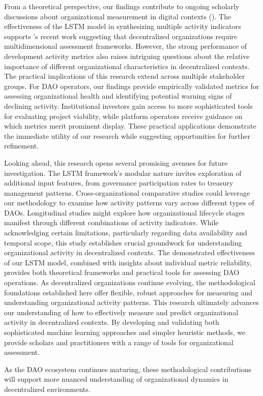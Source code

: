 From a theoretical perspective, our findings contribute to ongoing scholarly discussions about organizational measurement in digital contexts (\cite{fonseca2017succeed}). The effectiveness of the LSTM model in synthesizing multiple activity indicators supports \textcite{li2022future}'s recent work suggesting that decentralized organizations require multidimensional assessment frameworks. However, the strong performance of development activity metrics also raises intriguing questions about the relative importance of different organizational characteristics in decentralized contexts.
The practical implications of this research extend across multiple stakeholder groups. For DAO operators, our findings provide empirically validated metrics for assessing organizational health and identifying potential warning signs of declining activity. Institutional investors gain access to more sophisticated tools for evaluating project viability, while platform operators receive guidance on which metrics merit prominent display. These practical applications demonstrate the immediate utility of our research while suggesting opportunities for further refinement.

Looking ahead, this research opens several promising avenues for future investigation. The LSTM framework's modular nature invites exploration of additional input features, from governance participation rates to treasury management patterns. Cross-organizational comparative studies could leverage our methodology to examine how activity patterns vary across different types of DAOs. Longitudinal studies might explore how organizational lifecycle stages manifest through different combinations of activity indicators.
While acknowledging certain limitations, particularly regarding data availability and temporal scope, this study establishes crucial groundwork for understanding organizational activity in decentralized contexts. The demonstrated effectiveness of our LSTM model, combined with insights about individual metric reliability, provides both theoretical frameworks and practical tools for assessing DAO operations. As decentralized organizations continue evolving, the methodological foundations established here offer flexible, robust approaches for measuring and understanding organizational activity patterns.
This research ultimately advances our understanding of how to effectively measure and predict organizational activity in decentralized contexts. By developing and validating both sophisticated machine learning approaches and simpler heuristic methods, we provide scholars and practitioners with a range of tools for organizational assessment. 

As the DAO ecosystem continues maturing, these methodological contributions will support more nuanced understanding of organizational dynamics in decentralized environments.